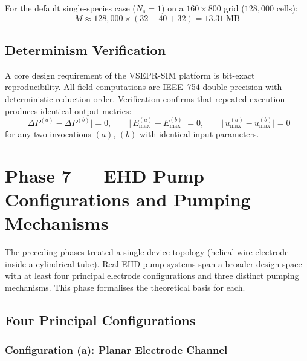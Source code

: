 \documentclass[11pt,a4paper]{article}
\begin{document}
For the default single-species case ($N_s = 1$) on a $160\times 800$ grid
($128{,}000$ cells):
\begin{equation}
  M \approx 128{,}000 \times (32 + 40 + 32) = 13.31\;\text{MB}
\end{equation}

\subsection{Determinism Verification}

A core design requirement of the VSEPR-SIM platform is bit-exact
reproducibility.  All field computations are IEEE~754 double-precision with
deterministic reduction order.  Verification confirms that repeated
execution produces identical output metrics:
\begin{equation}\label{eq:determinism}
  \bigl|\,\Delta P^{(a)} - \Delta P^{(b)}\bigr| = 0,
  \qquad
  \bigl|\,E_{\max}^{(a)} - E_{\max}^{(b)}\bigr| = 0,
  \qquad
  \bigl|\,u_{\max}^{(a)} - u_{\max}^{(b)}\bigr| = 0
\end{equation}
for any two invocations $(a)$, $(b)$ with identical input parameters.

\section{Phase 7 — EHD Pump Configurations and Pumping Mechanisms}
\label{sec:phase7}

The preceding phases treated a single device topology (helical wire electrode
inside a cylindrical tube).  Real EHD pump systems span a broader design space
with at least four principal electrode configurations and three distinct
pumping mechanisms.  This phase formalises the theoretical basis for each.

\subsection{Four Principal Configurations}

\subsubsection{Configuration (a): Planar Electrode Channel}
\end{document}
